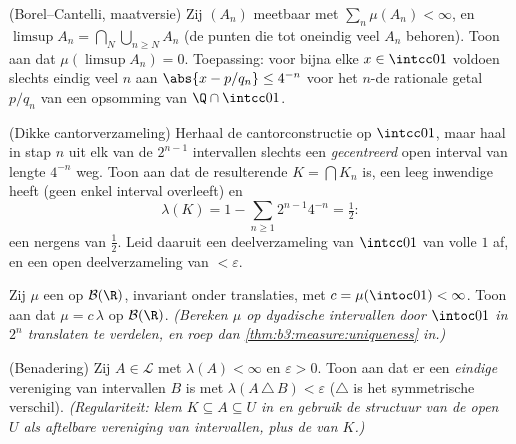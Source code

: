\begin{exercise}[$\star\star$]\label{exo:b3:measure:4}
(Borel--Cantelli, maatversie) Zij $(A_n)$ meetbaar met
$\sum_n\mu(A_n) < \infty$, en $\limsup A_n =
\bigcap_N\bigcup_{n\geq N}A_n$ (de punten die tot oneindig veel
$A_n$ behoren). Toon aan dat $\mu(\limsup A_n) = 0$. Toepassing:
voor bijna elke $x \in \intcc01$ voldoen slechts eindig veel $n$
aan $\abs{x - p/q_n} \leq 4^{-n}$ voor het $n$-de rationale getal
$p/q_n$ van een opsomming van $\Q\cap\intcc01$.
\end{exercise}

\begin{exercise}[$\star\star$]\label{exo:b3:measure:5}
(Dikke cantorverzameling) Herhaal de cantorconstructie op
$\intcc01$, maar haal in stap $n$ uit elk van de $2^{n-1}$
intervallen slechts een \emph{gecentreerd} open interval van
lengte $4^{-n}$ weg. Toon aan dat de resulterende $K = \bigcap
K_n$  is, een leeg inwendige heeft (geen enkel interval
overleeft) en
\[
\lambda(K) = 1 - \sum_{n\geq1}2^{n-1}4^{-n} = \tfrac12 :
\]
een nergens  van  $\frac12$. Leid daaruit
een \emph{} deelverzameling van $\intcc01$ van volle 
$1$ af, en een open  deelverzameling van  $<
\varepsilon$.
\end{exercise}

\begin{exercise}[$\star\star$]\label{exo:b3:measure:6}
Zij $\mu$ een  op $\mathcal B(\R)$, invariant onder
translaties, met $c = \mu(\intoc01) < \infty$. Toon aan dat $\mu =
c\,\lambda$ op $\mathcal B(\R)$. \emph{(Bereken $\mu$ op dyadische
intervallen door $\intoc01$ in $2^n$ translaten te verdelen, en
roep dan \cref{thm:b3:measure:uniqueness} in.)}
\end{exercise}

\begin{exercise}[$\star\star$]\label{exo:b3:measure:7}
(Benadering) Zij $A \in \mathcal L$ met $\lambda(A) < \infty$ en
$\varepsilon > 0$. Toon aan dat er een \emph{eindige} vereniging
van intervallen $B$ is met $\lambda(A\,\triangle\,B) <
\varepsilon$ ($\triangle$ is het symmetrische verschil).
\emph{(Regulariteit: klem $K \subseteq A \subseteq U$ in en
gebruik de structuur van de open $U$ als aftelbare vereniging van
intervallen, plus de  van $K$.)}
\end{exercise}

